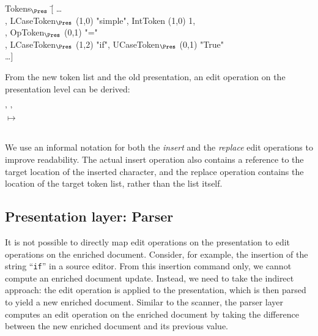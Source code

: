 \small \ttfamily
\begin{tabbing}
Tokens$_{\Pres}$ \= [ \dots \\
                           \> , LCaseToken$_{\Pres}$ (1,0) "simple", IntToken (1,0) 1,\\
                           \> , OpToken$_{\Pres}$ (0,1) "="\\
                           \> , LCaseToken$_{\Pres}$ (1,2) "if", UCaseToken$_{\Pres}$ (0,1) "True"\\
                           \> \dots ]                      
\end{tabbing}
\rmfamily \normalsize
 
From the new token list and the old presentation, an edit operation on the presentation level can be derived:

\small \ttfamily
\begin{tabbing}
 \ttfamily ' ' \\
$\mapsto$\\
 \\  
  
\end{tabbing}
\rmfamily \normalsize

We use an informal notation for both the {\em insert} and the {\em replace} edit operations to improve readability. The actual insert operation also contains a reference to the target location of the inserted character, and the replace operation contains the location of the target token list, rather than the list itself. 


%																
\subsection{Presentation layer: Parser} \label{sect:parser}
        

It is not possible to directly map edit operations on the presentation to edit operations on the enriched document. Consider, for example, the insertion of the string ``\verb|if|'' in a source editor. From this insertion command only, we cannot compute an enriched document update. Instead, we need to take the indirect approach: the edit operation is applied to the presentation, which is then parsed to yield a new enriched document. Similar to the scanner, the parser layer computes an edit operation on the enriched document by taking the difference between the new enriched document and its previous value. 

